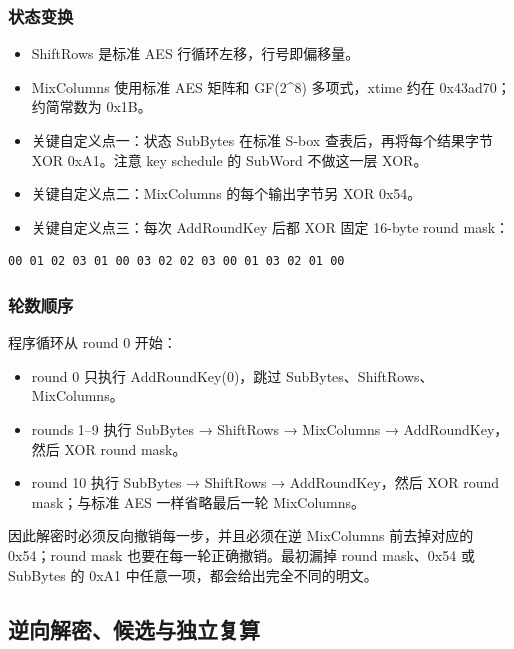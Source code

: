 \subsubsection{状态变换}\label{ux72b6ux6001ux53d8ux6362}

\begin{itemize}
\tightlist
\item
  ShiftRows 是标准 AES 行循环左移，行号即偏移量。
\item
  MixColumns 使用标准 AES 矩阵和 GF(2\^{}8) 多项式，xtime 约在 0x43ad70；约简常数为 0x1B。
\item
  关键自定义点一：状态 SubBytes 在标准 S-box 查表后，再将每个结果字节 XOR 0xA1。注意 key schedule 的 SubWord 不做这一层 XOR。
\item
  关键自定义点二：MixColumns 的每个输出字节另 XOR 0x54。
\item
  关键自定义点三：每次 AddRoundKey 后都 XOR 固定 16-byte round mask：
\end{itemize}

\begin{verbatim}
00 01 02 03 01 00 03 02 02 03 00 01 03 02 01 00
\end{verbatim}

\subsubsection{轮数顺序}\label{ux8f6eux6570ux987aux5e8f}

程序循环从 round 0 开始：

\begin{itemize}
\tightlist
\item
  round 0 只执行 AddRoundKey(0)，跳过 SubBytes、ShiftRows、MixColumns。
\item
  rounds 1--9 执行 SubBytes → ShiftRows → MixColumns → AddRoundKey，然后 XOR round mask。
\item
  round 10 执行 SubBytes → ShiftRows → AddRoundKey，然后 XOR round mask；与标准 AES 一样省略最后一轮 MixColumns。
\end{itemize}

因此解密时必须反向撤销每一步，并且必须在逆 MixColumns 前去掉对应的 0x54；round mask 也要在每一轮正确撤销。最初漏掉 round mask、0x54 或 SubBytes 的 0xA1 中任意一项，都会给出完全不同的明文。

\subsection{逆向解密、候选与独立复算}\label{ux9006ux5411ux89e3ux5bc6ux5019ux9009ux4e0eux72ecux7acbux590dux7b97}

